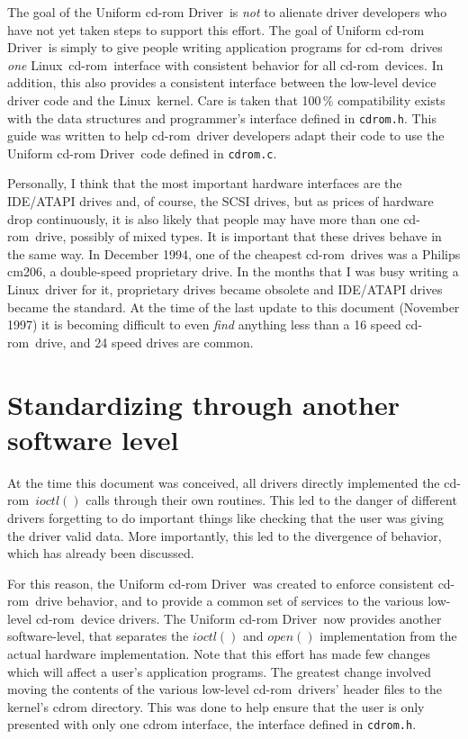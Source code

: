 \documentclass{article}
\newcommand{\newsection}[1]{\newpage\section{#1}}
\def\linux{{\sc Linux}}
\def\cdrom{{\sc cd-rom}}
\def\UCD{{\sc Uniform cd-rom Driver}}
\def\cdromc{{\tt {cdrom.c}}}
\def\cdromh{{\tt {cdrom.h}}}
\begin{document}
The goal of the \UCD\ is {\em not\/} to alienate driver developers who
have not yet taken steps to support this effort. The goal of \UCD\ is
simply to give people writing application programs for \cdrom\ drives
{\em one\/} \linux\ \cdrom\ interface with consistent behavior for all
\cdrom\ devices. In addition, this also provides a consistent interface
between the low-level device driver code and the \linux\ kernel. Care
is taken that 100\,\% compatibility exists with the data structures and
programmer's interface defined in \cdromh. This guide was written to
help \cdrom\ driver developers adapt their code to use the \UCD\ code
defined in \cdromc.

Personally, I think that the most important hardware interfaces are
the IDE/ATAPI drives and, of course, the SCSI drives, but as prices
of hardware drop continuously, it is also likely that people may have
more than one \cdrom\ drive, possibly of mixed types. It is important
that these drives behave in the same way. In December 1994, one of the
cheapest \cdrom\ drives was a Philips cm206, a double-speed proprietary
drive. In the months that I was busy writing a \linux\ driver for it,
proprietary drives became obsolete and IDE/ATAPI drives became the
standard. At the time of the last update to this document (November
1997) it is becoming difficult to even {\em find} anything less than a
16 speed \cdrom\ drive, and 24 speed drives are common.

\newsection{Standardizing through another software level}
\label{cdrom.c}

At the time this document was conceived, all drivers directly
implemented the \cdrom\ $ioctl()$ calls through their own routines. This
led to the danger of different drivers forgetting to do important things
like checking that the user was giving the driver valid data. More
importantly, this led to the divergence of behavior, which has already
been discussed.

For this reason, the \UCD\ was created to enforce consistent \cdrom\
drive behavior, and to provide a common set of services to the various
low-level \cdrom\ device drivers. The \UCD\ now provides another
software-level, that separates the $ioctl()$ and $open()$ implementation
from the actual hardware implementation. Note that this effort has
made few changes which will affect a user's application programs. The
greatest change involved moving the contents of the various low-level
\cdrom\ drivers' header files to the kernel's cdrom directory. This was
done to help ensure that the user is only presented with only one cdrom
interface, the interface defined in \cdromh.
\end{document}
